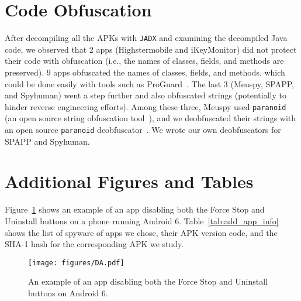 \documentclass[sigconf,balance=false]{acmart}
\begin{document}
\section{Code Obfuscation}
\label{sec:apk_obfuscation}

After decompiling all the APKs with \texttt{JADX} and examining the
decompiled Java code, we observed that 2 apps (Highstermobile and
iKeyMonitor) did not protect their code with obfuscation
(i.e., the names of classes, fields, and methods are preserved). 9
apps obfuscated the names of classes, fields, and methods, which could
be done easily with tools such as ProGuard~\cite{LeaderIn1:online}.
The last 3 (Meuspy, SPAPP, and Spyhuman)
went a step further and also obfuscated strings (potentially to hinder
reverse engineering efforts). Among these three, Meuspy used
\texttt{paranoid} (an open source string obfuscation
tool~\cite{MichaelR90:online}), and we deobfuscated their strings with
an open source \texttt{paranoid}
deobfuscator~\cite{giacomof39:online}. We wrote our own deobfuscators
for SPAPP and Spyhuman.


\section{Additional Figures and Tables}
\label{sec:additional_figures}

Figure~\ref{fig:da} shows an example of an app disabling both the Force Stop and Uninstall buttons on a phone running Android 6. Table~\ref{tab:add_app_info} shows the list of spyware of apps we chose, their APK version code, and the SHA-1 hash for the corresponding APK we study.

\begin{figure}[t]
\centering
\texttt{[image: figures/DA.pdf]}
\caption{An example of an app disabling both the
Force Stop and Uninstall buttons on Android 6.}
\label{fig:da}
\end{figure}







\end{document}
